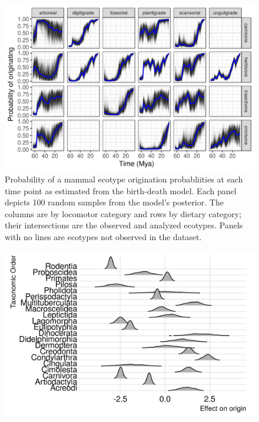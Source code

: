\documentclass[12pt,letterpaper]{article}
\begin{document}
\begin{figure}[ht]
  \centering
  \includegraphics[width=\textwidth,height=0.4\textheight,keepaspectratio=true]{figure/ecotype_origin_bd}
  \caption[Ecotype origination probability estimated from the birth-death model]{Probability of a mammal ecotype origination probabliities at each time point as estimated from the birth-death model. Each panel depicts 100 random samples from the model's posterior. The columns are by locomotor category and rows by dietary category; their intersections are the observed and analyzed ecotypes. Panels with no lines are ecotypes not observed in the dataset.}
  \label{fig:eco_origin}
\end{figure}

\begin{figure}[ht]
  \centering
  \includegraphics[width=\textwidth,height=0.4\textheight,keepaspectratio=true]{figure/order_origin_bd}
  \caption{}
  \label{fig:order_origin}
\end{figure}
\end{document}

